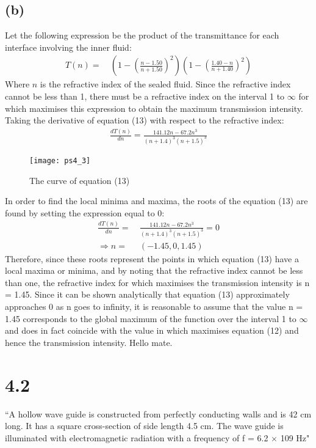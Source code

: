 \documentclass[8pt,a4paper,oneside]{article}
\begin{document}
\subsection*{(b)}
Let the following expression be the product of the transmittance for each interface involving the inner fluid:
\begin{align}
	T(n) =&~\left(1 - \left(\frac{n - 1.50}{n + 1.50}\right)^2\right )\left(1 - \left(\frac{1.40 - n}{n + 1.40}\right)^2\right)
\end{align}
Where $n$ is the refractive index of the sealed fluid. Since the refractive index cannot be less than 1, there must be a refractive index on the interval 1 to $\infty $ for which maximises this expression to obtain the maximum transmission intensity. Taking the derivative of equation (13) with respect to the refractive index:
\begin{align}
	\frac{dT(n)}{dn} = \frac{141.12n-67.2 n^3}{(n+1.4)^3 (n+1.5)^3}
\end{align}
\begin{figure}[h!]
\begin{center}
\texttt{[image: ps4\_3]}
\caption{The curve of equation (13)}
\label{default}
\end{center}
\end{figure}

In order to find the local minima and maxima, the roots of the equation (13) are found by setting the expression equal to 0:
\begin{align}
	\frac{dT(n)}{dn} =&~ \frac{141.12n-67.2 n^3}{(n+1.4)^3 (n+1.5)^3} = 0\\
	\Rightarrow n =&~ (-1.45, 0, 1.45)
\end{align}
Therefore, since these roots represent the points in which equation (13) have a local maxima or minima, and by noting that the refractive index cannot be less than one, the refractive index for which maximises the transmission intensity is n = 1.45. Since it can be shown analytically that equation (13) approximately approaches 0 as n goes to infinity, it is reasonable to assume that the value n = 1.45 corresponds to the global maximum of the function over the interval 1 to $\infty$ and does in fact coincide with the value in which maximises equation (12) and hence the transmission intensity. 
Hello mate.

\section*{4.2}
``A hollow wave guide is constructed from perfectly conducting walls and is 42 cm
long. It has a square cross-section of side length 4.5 cm. The wave guide is
illuminated with electromagnetic radiation with a frequency of f = 6.2 $\times$ 109 Hz"
\end{document}
